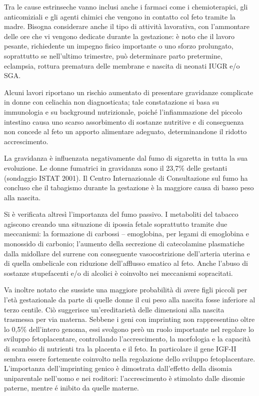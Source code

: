 Tra le cause estrinseche vanno inclusi anche i farmaci come i chemioterapici, gli anticomiziali
e gli agenti chimici che vengono in contatto col feto tramite la madre.
Bisogna considerare anche il tipo di attivit\`a lavorativa, con l'ammontare delle ore
che vi vengono dedicate durante la gestazione: \`e noto che il lavoro pesante, 
richiedente un impegno fisico importante o uno sforzo prolungato, soprattutto se nell'ultimo trimestre,
può determinare parto pretermine, eclampsia, rottura prematura delle membrane e nascita di 
neonati IUGR e/o SGA\cite{sga-14}.


Alcuni lavori riportano un rischio aumentato di presentare gravidanze complicate
in donne con celiachia non diagnosticata; tale constatazione si basa su immunologia e 
su background nutrizionale, poich\'e l'infiammazione del piccolo intestino causa uno
scarso assorbimento di sostanze nutritive e di conseguenza non concede al feto un apporto alimentare adeguato,
determinandone il ridotto accrescimento\cite{sga-15}.


La gravidanza \`e influenzata negativamente dal fumo di sigaretta in tutta la sua evoluzione.
Le donne fumatrici in gravidanza sono il 23,7\% delle gestanti (sondaggio ISTAT 2001).
Il Centro Internazionale di Consultazione sul fumo ha concluso che il tabagismo durante la gestazione
\`e la maggiore causa di basso peso alla nascita\cite{sga-18}.


Si \`e verificata altres\`i l'importanza del fumo passivo. I metaboliti del tabacco agiscono creando
una situazione di ipossia fetale soprattutto tramite due meccanismi: la formazione di carbossi -- emoglobina, 
per legami di emoglobina e monossido di carbonio; l'aumento della secrezione di catecolamine plasmatiche
dalla midollare del surrene con conseguente vasocostrizione dell'arteria uterina e di quella ombelicale
con riduzione dell'afflusso ematico al feto\cite{sga-20}.
Anche l'abuso di sostanze stupefacenti e/o di alcolici è coinvolto nei meccanismi sopracitati\cite{sga-24}\cite{sga-25}.


Va inoltre notato che sussiste una maggiore probabilità di avere figli piccoli per l'et\`a gestazionale
da parte di quelle donne il cui peso alla nascita fosse inferiore al terzo centile.
Ciò suggerisce un'ereditarietà delle dimensioni alla nascita trasmessa per via materna. Sebbene
i geni con imprinting non rappresentino oltre lo 0,5\% dell'intero genoma, essi svolgono
però un ruolo importante nel regolare lo sviluppo fetoplacentare, controllando l'accrescimento, la 
morfologia e la capacità di scambio di nutrienti tra la placenta e il feto.
In particolare il gene IGF-II sembra essere fortemente coinvolto nella regolazione dello sviluppo
fetoplacentare. L'importanza dell'imprinting genico è dimostrata dall'effetto della disomia uniparentale
nell'uomo e nei roditori: l'accrescimento è stimolato dalle disomie paterne, mentre \'e inibito da quelle materne.\cite{fowden2006imprinted}


